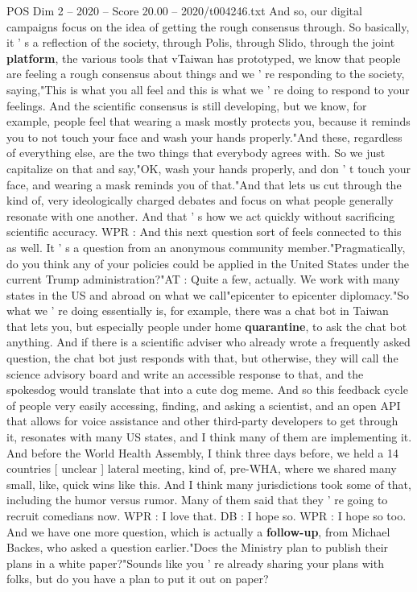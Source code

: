 \begin{textsample}{POS Dim 2 – 2020 – Score 20.00 – 2020/t004246.txt}
And so, our digital campaigns focus on the idea of getting the rough consensus through.
So basically, it ' s a reflection of the society, through Polis, through Slido, through the joint \textbf{platform}, the various tools that vTaiwan has prototyped, we know that people are feeling a rough consensus about things and we ' re responding to the society, saying,"This is what you all feel and this is what we ' re doing to respond to your feelings.
And the scientific consensus is still developing, but we know, for example, people feel that wearing a mask mostly protects you, because it reminds you to not touch your face and wash your hands properly."And these, regardless of everything else, are the two things that everybody agrees with.
So we just capitalize on that and say,"OK, wash your hands properly, and don ' t touch your face, and wearing a mask reminds you of that."And that lets us cut through the kind of, very ideologically charged debates and focus on what people generally resonate with one another.
And that ' s how we act quickly without sacrificing scientific accuracy.
WPR : And this next question sort of feels connected to this as well.
It ' s a question from an anonymous community member."Pragmatically, do you think any of your policies could be applied in the United States under the current Trump administration?"AT : Quite a few, actually.
We work with many states in the US and abroad on what we call"epicenter to epicenter diplomacy."So what we ' re doing essentially is, for example, there was a chat bot in Taiwan that lets you, but especially people under home \textbf{quarantine}, to ask the chat bot anything.
And if there is a scientific adviser who already wrote a frequently asked question, the chat bot just responds with that, but otherwise, they will call the science advisory board and write an accessible response to that, and the spokesdog would translate that into a cute dog meme.
And so this feedback cycle of people very easily accessing, finding, and asking a scientist, and an open API that allows for voice assistance and other third-party developers to get through it, resonates with many US states, and I think many of them are implementing it.
And before the World Health Assembly, I think three days before, we held a 14 countries [ unclear ] lateral meeting, kind of, pre-WHA, where we shared many small, like, quick wins like this.
And I think many jurisdictions took some of that, including the humor versus rumor.
Many of them said that they ' re going to recruit comedians now.
WPR : I love that.
DB : I hope so.
WPR : I hope so too.
And we have one more question, which is actually a \textbf{follow-up}, from Michael Backes, who asked a question earlier."Does the Ministry plan to publish their plans in a white paper?"Sounds like you ' re already sharing your plans with folks, but do you have a plan to put it out on paper?

\end{textsample}
